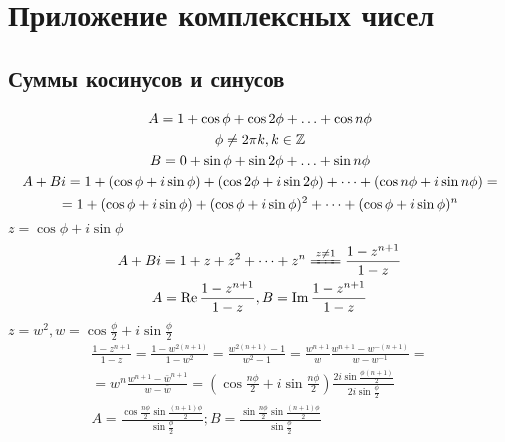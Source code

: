 ﻿\section{Приложение комплексных чисел}
\subsection{Суммы косинусов и синусов}
\begin{gather*}
A = 1 + \cos \phi + \cos 2\phi + \ldots + \cos n \phi \\
\phi \ne 2\pi k, k \in \mathbb{Z} \\
B = 0 + \sin \phi + \sin 2\phi + \ldots + \sin n \phi \\
A + Bi = 1 + (\cos \phi + i \sin \phi) + (\cos 2\phi + i \sin 2\phi) + \cdots + (\cos n\phi + i\sin n\phi) = \\
= 1 + (\cos \phi + i \sin \phi) + (\cos \phi + i\sin \phi)^2 + \cdots + (\cos \phi + i \sin \phi)^n
\end{gather*}
$z = \cos \phi + i\sin \phi$
\begin{gather*}
A + Bi = 1 + z + z^2 + \cdots + z^n \xlongequal{z \ne 1} \frac{1 - z^{n + 1}}{1 - z} \\
A = \Re\frac{1 - z^{n + 1}}{1 - z}, B = \Im \frac{1 - z^{n + 1}}{1 - z} \\
\end{gather*}
$z = w^2, w = \cos \frac{\phi}{2} + i \sin\frac{\phi}{2}$
\begin{gather*}
\frac{1 - z^{n + 1}}{1 - z} = \frac{1 - w^{2(n + 1)}}{1 - w^2} = \frac{w^{2(n + 1)} - 1}{w^2 - 1} = \frac{w^{n + 1}}{w}\frac{w^{n + 1} - w^{-(n + 1)}}{w - w^{-1}} = \\
= w^{n}\frac{w^{n + 1} - \bar{w}^{n + 1}}{w - \bar{w}} = \left(\cos \frac{n\phi}{2} + i\sin \frac{n\phi}{2}\right) \frac{2i\sin\frac{\phi(n + 1)}{2}}{2i\sin\frac{\phi}{2}} \\
A = \frac{\cos\frac{n\phi}{2} \sin \frac{(n + 1)\phi}{2}}{\sin\frac{\phi}{2}}; B = \frac{\sin\frac{n\phi}{2} \sin \frac{(n + 1)\phi}{2}}{\sin\frac{\phi}{2}} \\
\end{gather*}

